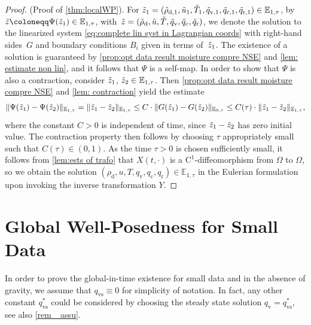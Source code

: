\documentclass[10pt]{amsart}
\theoremstyle{plain}
\theoremstyle{definition}
\theoremstyle{thm}
\numberwithin{equation}{section}
\newcommand{\rC}{\mathrm{C}}
\newcommand{\E}{\mathbb{E}}
\newcommand{\rd}{\mathrm{d}}
\newcommand{\rr}{\mathrm{r}}
\newcommand{\rv}{\mathrm{v}}
\newcommand{\rvs}{\mathrm{vs}}
\newcommand{\rc}{\mathrm{c}}
\newcommand{\trho}{\Tilde{\rho}}
\newcommand{\tu}{\Tilde{u}}
\newcommand{\tz}{\Tilde{z}}
\newcommand{\tT}{\Tilde{T}}
\newcommand{\tq}{\Tilde{q}}
\begin{document}
\begin{proof}{(Proof of \autoref{thm:localWP}).}
For $\tz_1 = (\trho_{\rd,1},\tu_1,\tT_1,\tq_{\rv,1},\tq_{\rc,1},\tq_{\rr,1})  \in \E_{1,\tau}$, by $\tz \coloneqq \Psi(\tz_1) \in \E_{1,\tau}$, with~$\tz = (\trho_\rd, \tu,\tT,\tq_\rv, \tq_\rc,\tq_\rr)$, we denote the solution to the linearized system \eqref{eq:complete lin syst in Lagrangian coords} with right-hand sides~$G$ and boundary conditions $B_i$ given in terms of~$\tz_1$. 
The existence of a solution is guaranteed by \autoref{prop:opt data result moisture compre NSE} and \autoref{lem: estimate non lin}, and it follows that $\Psi$ is a self-map. 
In order to show that $\Psi$ is also a contraction, consider $\tz_1$, $\tz_2 \in \E_{1,\tau}$. 
Then \autoref{prop:opt data result moisture compre NSE} and \autoref{lem: contraction} yield the estimate
\begin{equation*}
    \| \Psi(\tz_1) - \Psi(\tz_2) \|_{\E_{1,\tau}} =  \| \tz_1 - \tz_2 \|_{\E_{1,\tau}} \le C \cdot \| G(\tz_1) - G(\tz_2) \|_{\E_{0,\tau}} \le C(\tau) \cdot \| \tz_1 - \tz_2 \|_{\E_{1,\tau}},
\end{equation*}
where the constant $C>0$ is independent of time, since $\tz_1-\tz_2$ has zero initial value. 
The contraction property then follows by choosing $\tau$ appropriately small such that $C(\tau) \in (0,1)$.
As the time $\tau > 0$ is chosen sufficiently small, it follows from \autoref{lem:ests of trafo} that $X(t,\cdot)$ is a $\rC^1$-diffeomorphism from $\Omega$ to $\Omega$, so we obtain the solution $(\rho_\rd,u,T,q_\rv,q_\rc,q_\rr) \in \E_{1,\tau}$ in the Eulerian formulation upon invoking the inverse transformation $Y$.
\end{proof}



\section{Global Well-Posedness for Small Data}\label{sec: global}

In order to prove the global-in-time existence for small data and in the absence of gravity, we assume that $q_\rvs \equiv 0$ for simplicity of notation. 
In fact, any other constant $q_\rvs^*$ could be considered by choosing the steady state solution $q_\rv =q_\rvs^*$, see also \autoref{rem_ assu}.
\end{document}
